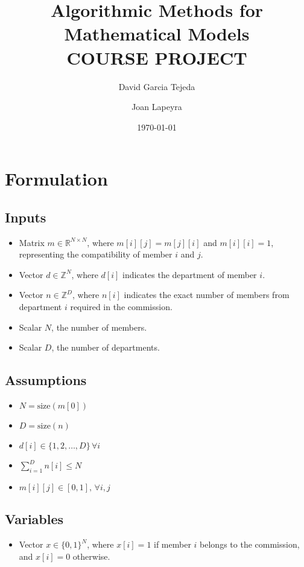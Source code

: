 \documentclass{article}
\title{%
  Algorithmic Methods for Mathematical Models\\
  \large COURSE PROJECT }
\author{David Garcia Tejeda \and Joan Lapeyra}
\date{\today}
\begin{document}
\maketitle

\section{Formulation}

\subsection*{Inputs}
\begin{itemize}
    \item Matrix \( m \in \mathbb{R}^{N \times N} \), where \( m[i][j] = m[j][i] \) and \( m[i][i] = 1 \), representing the compatibility of member \( i \) and \( j \).
    \item Vector \( d \in \mathbb{Z}^N \), where \( d[i] \) indicates the department of member \( i \).
    \item Vector \( n \in \mathbb{Z}^D \), where \( n[i] \) indicates the exact number of members from department \( i \) required in the commission.
    \item Scalar \( N \), the number of members.
    \item Scalar \( D \), the number of departments.
\end{itemize}

\subsection*{Assumptions}
\begin{itemize}
    \item \( N = \text{size}(m[0]) \)
    \item \( D = \text{size}(n) \)
    \item \( d[i] \in \{1,2,\dots, D\} \, \forall i \)
    \item \( \sum_{i=1}^{D} n[i] \leq N \)
    \item \( m[i][j] \in [0, 1], \, \forall i, j \)
\end{itemize}

\subsection*{Variables}
\begin{itemize}
    \item Vector \( x \in \{0, 1\}^N \), where \( x[i] = 1 \) if member \( i \) belongs to the commission, and \( x[i] = 0 \) otherwise.
\end{itemize}
\end{document}
